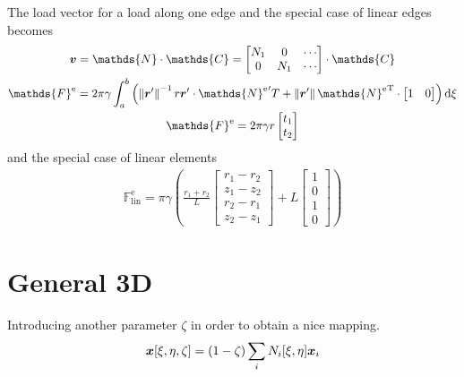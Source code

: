 \documentclass[a4paper,11pt]{article}
\renewcommand{\to}[1]{\text{\boldmath $#1$}} %
\newcommand{\um}[1]{\mathds{#1}}
\newcommand{\intd}[1]{\mathrm{d}#1}
\newcommand{\norm}[1]{\left\lVert{#1}\right\rVert}
\newcommand{\T}{\mathrm{T}}
\newcommand{\element}{\mathrm{e}}
\newcommand{\linear}{\mathrm{lin}}
\begin{document}
The load vector for a load along one edge and the special case of linear edges becomes
\begin{gather}
 \to v = \um{N}\cdot\um{C} = \begin{bmatrix}N_1 & 0 & \cdots\\ 0 & N_1 & \cdots \end{bmatrix}\cdot \um{C}\\
 \um F^\element = 2\pi \gamma \int_a^b \left(\norm{\to r'}^{-1}r\to r'\cdot{\um N^\element}'^\T + \norm{\to r'}{\um N^\element}^\T\cdot\begin{bmatrix}1&0\end{bmatrix}\right) \intd\xi\\
 \um F^\element = 2\pi \gamma r \begin{bmatrix}t_1\\t_2\end{bmatrix}
\end{gather}
and the special case of linear elements
\begin{gather}
 \um F^\element_\linear = \pi \gamma \left(\frac{r_1+r_2}{L}\begin{bmatrix}r_1-r_2\\z_1-z_2\\r_2-r_1\\z_2-z_1\end{bmatrix} + L\begin{bmatrix}1\\0\\1\\0\end{bmatrix}\right)
\end{gather}

\section{General 3D}

Introducing another parameter $\zeta$ in order to obtain a nice mapping.
\begin{align}
 \to x[\xi,\eta,\zeta] = (1-\zeta)\sum_i N_i[\xi,\eta]\to x_i
\end{align}
\end{document}
